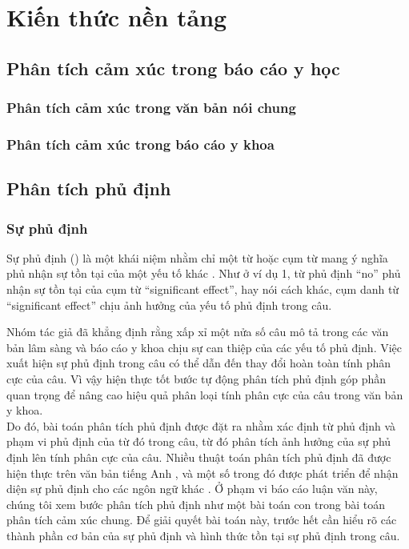 \section{Kiến thức nền tảng}
\subsection{Phân tích cảm xúc trong báo cáo y học}
\subsubsection*{Phân tích cảm xúc trong văn bản nói chung}
\subsubsection*{Phân tích cảm xúc trong báo cáo y khoa}
\subsection{Phân tích phủ định}
\subsubsection*{Sự phủ định}
Sự phủ định () là một khái niệm nhằm chỉ một từ hoặc cụm từ mang ý nghĩa phủ nhận sự tồn tại của một yếu tố khác \cite{skeppstedt2016marker}. Như ở ví dụ 1, từ phủ định ``no'' phủ nhận sự tồn tại của cụm từ ``significant effect'', hay nói cách khác, cụm danh từ ``significant effect'' chịu ảnh hưởng của yếu tố phủ định trong câu. 


Nhóm tác giả \cite{chapman2001evaluation} đã khẳng định rằng xấp xỉ một nửa số câu mô tả trong các văn bản lâm sàng và báo cáo y khoa chịu sự can thiệp của các yếu tố phủ định. Việc xuất hiện sự phủ định trong câu có thể dẫn đến thay đổi hoàn toàn tính phân cực của câu. Vì vậy hiện thực tốt bước tự động phân tích phủ định góp phần quan trọng để nâng cao hiệu quả phân loại tính phân cực của câu trong văn bản y khoa.\\

Do đó, bài toán phân tích phủ định được đặt ra nhằm xác định từ phủ định và phạm vi phủ định của từ đó trong câu, từ đó phân tích ảnh hưởng của sự phủ định lên tính phân cực của câu. Nhiều thuật toán phân tích phủ định đã được hiện thực trên văn bản tiếng Anh \cite{Aronow1999, chapman2001evaluation, Mutalik2001, Elkin2005, Zeng2007}, và một số trong đó được phát triển để nhận diện sự phủ định cho các ngôn ngữ khác \cite{benamara2012how, costumero2014an, Chapman2013, CruzDiaz2015, gindl2006negation}. Ở phạm vi báo cáo luận văn này, chúng tôi xem bước phân tích phủ định như một bài toán con trong bài toán phân tích cảm xúc chung. Để giải quyết bài toán này, trước hết cần hiểu rõ các thành phần cơ bản của sự phủ định và hình thức tồn tại sự phủ định trong câu.

